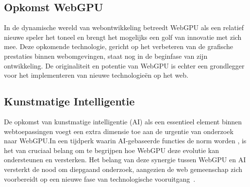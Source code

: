 




\subsection{Opkomst WebGPU}
In de dynamische wereld van webontwikkeling betreedt WebGPU als een relatief nieuwe speler het toneel en brengt het mogelijks een golf van innovatie met zich mee. Deze opkomende technologie, gericht op het verbeteren van de grafische prestaties binnen webomgevingen, staat nog in de beginfase van zijn ontwikkeling. De originaliteit en potentie van WebGPU is echter een grondlegger voor het implementeren van nieuwe technologieën op het web.

\subsection{Kunstmatige Intelligentie}
De opkomst van kunstmatige intelligentie (AI) als een essentieel element binnen webtoepassingen voegt een extra dimensie toe aan de urgentie van onderzoek naar WebGPU.\@ In een tijdperk waarin AI-gebaseerde functies de norm worden \textcite{QuantumBlack2022}, is het van cruciaal belang om te begrijpen hoe WebGPU deze evolutie kan ondersteunen en versterken. Het belang van deze synergie tussen WebGPU en AI versterkt de nood om diepgaand onderzoek, aangezien de web gemeenschap zich voorbereidt op een nieuwe fase van technologische vooruitgang~\autocite{Gu2023}.

